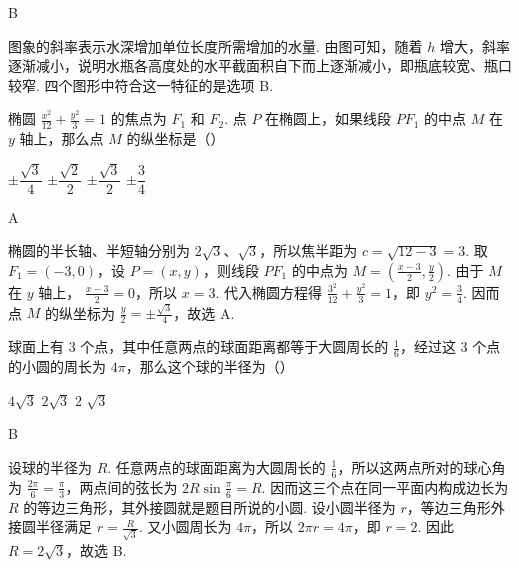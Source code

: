 \documentclass[UTF8,a4paper,oneside,11pt]{ctexbook}
\begin{document}
\begin{answer}
B
\end{answer}

\begin{solution}
图象的斜率表示水深增加单位长度所需增加的水量. 由图可知，随着 \(h\) 增大，斜率逐渐减小，说明水瓶各高度处的水平截面积自下而上逐渐减小，即瓶底较宽、瓶口较窄. 四个图形中符合这一特征的是选项 B.
\end{solution}

\begin{problem}
椭圆 \(\frac{x^2}{12} + \frac{y^2}{3} = 1\) 的焦点为 \(F_1\) 和 \(F_2\). 点 \(P\) 在椭圆上，如果线段 \(PF_1\) 的中点 \(M\) 在 \(y\) 轴上，那么点 \(M\) 的纵坐标是（\quad）

\choices
    {\(\pm\dfrac{\sqrt{3}}{4}\)}
    {\(\pm\dfrac{\sqrt{2}}{2}\)}
    {\(\pm\dfrac{\sqrt{3}}{2}\)}
    {\(\pm\dfrac{3}{4}\)}
\end{problem}

\begin{answer}
A
\end{answer}

\begin{solution}
椭圆的半长轴、半短轴分别为 \(2\sqrt{3}\)、\(\sqrt{3}\)，所以焦半距为
\(c=\sqrt{12-3}=3\). 取 \(F_1=(-3,0)\)，设 \(P=(x,y)\)，则线段 \(PF_1\) 的中点为
\(M=\left(\frac{x-3}{2},\frac{y}{2}\right)\). 由于 \(M\) 在 \(y\) 轴上，
\(\frac{x-3}{2}=0\)，所以 \(x=3\). 代入椭圆方程得
\(\frac{3^2}{12}+\frac{y^2}{3}=1\)，即 \(y^2=\frac{3}{4}\). 因而点 \(M\) 的纵坐标为
\(\frac{y}{2}=\pm\frac{\sqrt{3}}{4}\)，故选 A.
\end{solution}

\begin{problem}
球面上有 \(3\) 个点，其中任意两点的球面距离都等于大圆周长的 \(\frac{1}{6}\)，经过这 \(3\) 个点的小圆的周长为 \(4\pi\)，那么这个球的半径为（\quad）

\choices
    {\(4\sqrt{3}\)}
    {\(2\sqrt{3}\)}
    {\(2\)}
    {\(\sqrt{3}\)}
\end{problem}

\begin{answer}
B
\end{answer}

\begin{solution}
设球的半径为 \(R\). 任意两点的球面距离为大圆周长的 \(\frac{1}{6}\)，所以这两点所对的球心角为 \(\frac{2\pi}{6}=\frac{\pi}{3}\)，两点间的弦长为 \(2R\sin\frac{\pi}{6}=R\). 因而这三个点在同一平面内构成边长为 \(R\) 的等边三角形，其外接圆就是题目所说的小圆. 设小圆半径为 \(r\)，等边三角形外接圆半径满足 \(r=\frac{R}{\sqrt{3}}\). 又小圆周长为 \(4\pi\)，所以 \(2\pi r=4\pi\)，即 \(r=2\). 因此 \(R=2\sqrt{3}\)，故选 B.
\end{solution}
\end{document}
